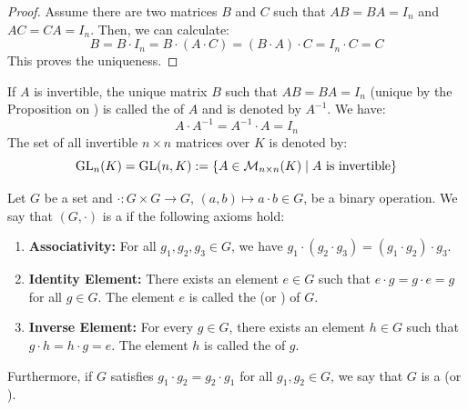 \begin{proof}
Assume there are two matrices $B$ and $C$ such that $AB = BA = I_n$ and $AC = CA = I_n$. Then, we can calculate:
\begin{equation*}
    B = B \cdot I_n = B \cdot (A \cdot C) = (B \cdot A) \cdot C = I_n \cdot C = C
\end{equation*}
This proves the uniqueness.
\end{proof}

\begin{definition}
\label{def:inverse_matrix_and_gl}
If $A$ is invertible, the unique matrix $B$ such that $AB = BA = I_n$ (unique by the Proposition on ) is called the  of $A$ and is denoted by $A^{-1}$. We have:
\begin{equation*}
    A \cdot A^{-1} = A^{-1} \cdot A = I_n
\end{equation*}
The set of all invertible $n \times n$ matrices over $K$ is denoted by:
\begin{equation*}
    \operatorname{GL}_n(K) = \operatorname{GL}(n, K) := \{A \in \mathcal{M}_{n \times n}(K) \mid A \text{ is invertible}\}
\end{equation*}
\end{definition}

\begin{definition}[Group]
\label{def:group}
Let $G$ be a set and $\cdot : G \times G \to G$, $(a,b) \mapsto a \cdot b \in G$, be a binary operation. We say that $(G, \cdot)$ is a  if the following axioms hold:
\begin{enumerate}
    \item \textbf{Associativity:} For all $g_1, g_2, g_3 \in G$, we have $g_1 \cdot (g_2 \cdot g_3) = (g_1 \cdot g_2) \cdot g_3$.
    \item \textbf{Identity Element:} There exists an element $e \in G$ such that $e \cdot g = g \cdot e = g$ for all $g \in G$. The element $e$ is called the  (or ) of $G$.
    \item \textbf{Inverse Element:} For every $g \in G$, there exists an element $h \in G$ such that $g \cdot h = h \cdot g = e$. The element $h$ is called the  of $g$.
\end{enumerate}
Furthermore, if $G$ satisfies $g_1 \cdot g_2 = g_2 \cdot g_1$ for all $g_1, g_2 \in G$, we say that $G$ is a  (or ).
\end{definition}

